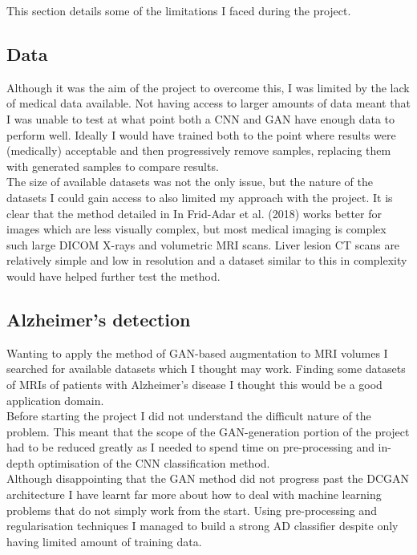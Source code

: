 \documentclass[
    author={Kai Hulme},
    supervisor={Dr Jon Bird},
    degree={BSc},
    title={Generative Adversarial Networks as an Augmentation Technique},
    subtitle={for Alzheimer's Disease Detection in MRI Volumes},
    type={Research},
    year={2021} 
]{dissertation}
\begin{document}
This section details some of the limitations I faced during the project.

\subsection{Data}

Although it was the aim of the project to overcome this, I was limited by the lack of medical data available. Not having access to larger amounts of data meant that I was unable to test at what point both a CNN and GAN have enough data to perform well. Ideally I would have trained both to the point where results were (medically) acceptable and then progressively remove samples, replacing them with generated samples to compare results. \\

The size of available datasets was not the only issue, but the nature of the datasets I could gain access to also limited my approach with the project. It is clear that the method detailed in In Frid-Adar et al. (2018) \cite{frid2018gan} works better for images which are less visually complex, but most medical imaging is complex such large DICOM X-rays and volumetric MRI scans. Liver lesion CT scans are relatively simple and low in resolution and a dataset similar to this in complexity would have helped further test the method.

\subsection{Alzheimer's detection}

Wanting to apply the method of GAN-based augmentation to MRI volumes I searched for available datasets which I thought may work. Finding some datasets of MRIs of patients with Alzheimer's disease I thought this would be a good application domain. \\

Before starting the project I did not understand the difficult nature of the problem. This meant that the scope of the GAN-generation portion of the project had to be reduced greatly as I needed to spend time on pre-processing and in-depth optimisation of the CNN classification method. \\

Although disappointing that the GAN method did not progress past the DCGAN architecture I have learnt far more about how to deal with machine learning problems that do not simply work from the start. Using pre-processing and regularisation techniques I managed to build a strong AD classifier despite only having limited amount of training data.
\end{document}

